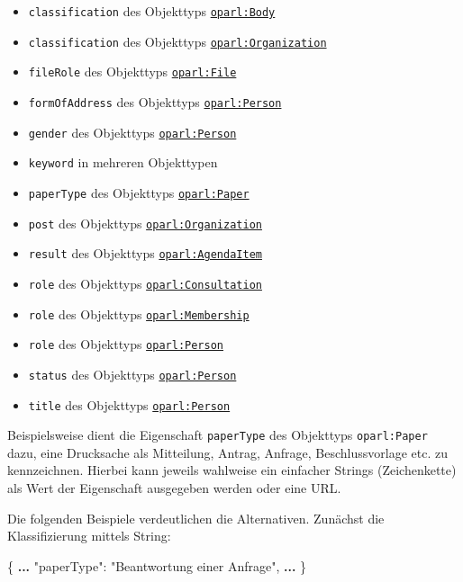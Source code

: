\documentclass[,a4paper]{article}
\newenvironment{Shaded}{}{}
\newcommand{\DataTypeTok}[1]{\textcolor[rgb]{0.56,0.13,0.00}{{#1}}}
\newcommand{\StringTok}[1]{\textcolor[rgb]{0.25,0.44,0.63}{{#1}}}
\newcommand{\FunctionTok}[1]{\textcolor[rgb]{0.02,0.16,0.49}{{#1}}}
\newcommand{\ErrorTok}[1]{\textcolor[rgb]{1.00,0.00,0.00}{\textbf{{#1}}}}
\begin{document}
\begin{itemize}
\itemsep1pt\parskip0pt
\item
  \texttt{classification} des Objekttyps
  \hyperref[oparlux5fbody]{\texttt{oparl:Body}}
\item
  \texttt{classification} des Objekttyps
  \hyperref[oparlux5forganization]{\texttt{oparl:Organization}}
\item
  \texttt{fileRole} des Objekttyps
  \hyperref[oparlux5ffile]{\texttt{oparl:File}}
\item
  \texttt{formOfAddress} des Objekttyps
  \hyperref[oparlux5fperson]{\texttt{oparl:Person}}
\item
  \texttt{gender} des Objekttyps
  \hyperref[oparlux5fperson]{\texttt{oparl:Person}}
\item
  \texttt{keyword} in mehreren Objekttypen
\item
  \texttt{paperType} des Objekttyps
  \hyperref[oparlux5fpaper]{\texttt{oparl:Paper}}
\item
  \texttt{post} des Objekttyps
  \hyperref[oparlux5forganization]{\texttt{oparl:Organization}}
\item
  \texttt{result} des Objekttyps
  \hyperref[oparlux5fagendaitem]{\texttt{oparl:AgendaItem}}
\item
  \texttt{role} des Objekttyps
  \hyperref[oparlux5fconsultation]{\texttt{oparl:Consultation}}
\item
  \texttt{role} des Objekttyps
  \hyperref[oparlux5fmembership]{\texttt{oparl:Membership}}
\item
  \texttt{role} des Objekttyps
  \hyperref[oparlux5fperson]{\texttt{oparl:Person}}
\item
  \texttt{status} des Objekttyps
  \hyperref[oparlux5fperson]{\texttt{oparl:Person}}
\item
  \texttt{title} des Objekttyps
  \hyperref[oparlux5fperson]{\texttt{oparl:Person}}
\end{itemize}

Beispielsweise dient die Eigenschaft \texttt{paperType} des Objekttyps
\texttt{oparl:Paper} dazu, eine Drucksache als Mitteilung, Antrag,
Anfrage, Beschlussvorlage etc. zu kennzeichnen. Hierbei kann jeweils
wahlweise ein einfacher Strings (Zeichenkette) als Wert der Eigenschaft
ausgegeben werden oder eine URL.

Die folgenden Beispiele verdeutlichen die Alternativen. Zunächst die
Klassifizierung mittels String:

\begin{Shaded}
\begin{Highlighting}[]
\FunctionTok{\{}
    \ErrorTok{...}
    \DataTypeTok{"paperType"}\FunctionTok{:} \StringTok{"Beantwortung einer Anfrage"}\FunctionTok{,}
    \ErrorTok{...}
\FunctionTok{\}}
\end{Highlighting}
\end{Shaded}
\end{document}
